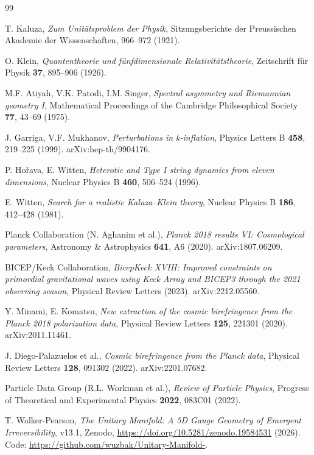 \documentclass[12pt,a4paper]{article}
\begin{document}
\begin{thebibliography}{99}

T. Kaluza,
\textit{Zum Unit{\"a}tsproblem der Physik},
Sitzungsberichte der Preussischen Akademie der Wissenschaften, 966--972 (1921).

O. Klein,
\textit{Quantentheorie und f{\"u}nfdimensionale Relativit{\"a}tstheorie},
Zeitschrift f{\"u}r Physik \textbf{37}, 895--906 (1926).

M.F. Atiyah, V.K. Patodi, I.M. Singer,
\textit{Spectral asymmetry and Riemannian geometry I},
Mathematical Proceedings of the Cambridge Philosophical Society
\textbf{77}, 43--69 (1975).

J. Garriga, V.F. Mukhanov,
\textit{Perturbations in k-inflation},
Physics Letters B \textbf{458}, 219--225 (1999).
arXiv:hep-th/9904176.

P. Ho\v{r}ava, E. Witten,
\textit{Heterotic and Type I string dynamics from eleven dimensions},
Nuclear Physics B \textbf{460}, 506--524 (1996).

E. Witten,
\textit{Search for a realistic Kaluza--Klein theory},
Nuclear Physics B \textbf{186}, 412--428 (1981).

Planck Collaboration (N. Aghanim et al.),
\textit{Planck 2018 results VI: Cosmological parameters},
Astronomy \& Astrophysics \textbf{641}, A6 (2020).
arXiv:1807.06209.

BICEP/Keck Collaboration,
\textit{BicepKeck XVIII: Improved constraints on primordial gravitational waves
using Keck Array and BICEP3 through the 2021 observing season},
Physical Review Letters (2023). arXiv:2212.05560.

Y. Minami, E. Komatsu,
\textit{New extraction of the cosmic birefringence from the Planck 2018
polarization data},
Physical Review Letters \textbf{125}, 221301 (2020).
arXiv:2011.11461.

J. Diego-Palazuelos et al.,
\textit{Cosmic birefringence from the Planck data},
Physical Review Letters \textbf{128}, 091302 (2022).
arXiv:2201.07682.

Particle Data Group (R.L. Workman et al.),
\textit{Review of Particle Physics},
Progress of Theoretical and Experimental Physics \textbf{2022}, 083C01 (2022).

T. Walker-Pearson,
\textit{The Unitary Manifold: A 5D Gauge Geometry of Emergent Irreversibility},
v13.1, Zenodo, \url{https://doi.org/10.5281/zenodo.19584531} (2026).
Code: \url{https://github.com/wuzbak/Unitary-Manifold-}.

\end{thebibliography}
\end{document}
